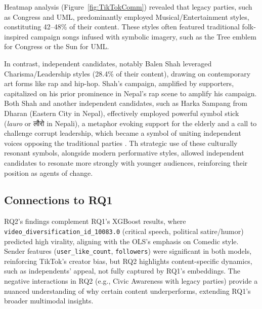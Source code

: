 \documentclass[12pt,a4paper]{report}
\begin{document}
Heatmap analysis (Figure~\ref{fig:TikTokComm}) revealed that legacy parties, such as Congress and UML, predominantly employed Musical/Entertainment styles, constituting 42--48\% of their content. These styles often featured traditional folk-inspired campaign songs infused with symbolic imagery, such as the Tree emblem for Congress or the Sun for UML. 

In contrast, independent candidates, notably Balen Shah leveraged Charisma/Leadership styles (28.4\% of their content), drawing on contemporary art forms like rap and hip-hop. Shah’s campaign, amplified by supporters, capitalized on his prior prominence in Nepal’s rap scene to amplify his campaign. Both Shah and another independent candidates, such as Harka Sampang from Dharan (Eastern City in Nepal), effectively employed powerful symbol stick (\textit{lauro} or \texthindi{लौरो} in Nepali), a metaphor evoking support for the elderly and a call to challenge corrupt leadership, which became a symbol of uniting independent voices opposing the traditional parties \parencite{AnnapurnaExpress2022}. Th strategic use of these culturally resonant symbols, alongside modern performative styles, allowed independent candidates to resonate more strongly with younger audiences, reinforcing their position as agents of change.


\subsection{Connections to RQ1}
RQ2’s findings complement RQ1’s XGBoost results, where \texttt{video\_diversification\_id\_10083.0} (critical speech, political satire/humor) predicted high virality, aligning with the OLS’s emphasis on Comedic style. Sender features (\texttt{user\_like\_count}, \texttt{followers}) were significant in both models, reinforcing TikTok’s creator bias, but RQ2 highlights content-specific dynamics, such as independents’ appeal, not fully captured by RQ1’s embeddings. The negative interactions in RQ2 (e.g., Civic Awareness with legacy parties) provide a nuanced understanding of why certain content underperforms, extending RQ1’s broader multimodal insights.
\newpage
\end{document}
